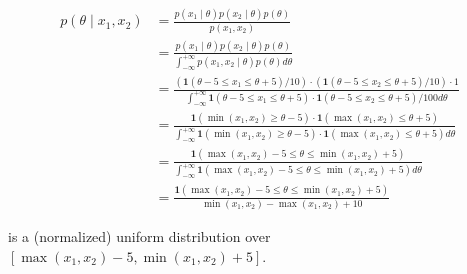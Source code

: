\documentclass[11pt]{article}
\begin{document}
\begin{enumerate}
    $$
    \begin{aligned}
        p(\theta \mid x_{1}, x_{2})
        &= \frac{p(x_{1} \mid \theta) p(x_{2} \mid \theta) p(\theta)}{p(x_{1}, x_{2})} \\
        &= \frac{p(x_{1} \mid \theta) p(x_{2} \mid \theta) p(\theta)}{\int_{-\infty}^{+\infty} p(x_{1}, x_{2} \mid \theta) p(\theta) d \theta} \\
        &= \frac{(\mathbf{1}(\theta - 5 \leq x_{1} \leq \theta + 5) / 10) \cdot (\mathbf{1}(\theta - 5 \leq x_{2} \leq \theta + 5) / 10) \cdot  1}{\int_{-\infty}^{+\infty} \mathbf{1}(\theta - 5 \leq x_{1} \leq \theta + 5) \cdot \mathbf{1}(\theta - 5 \leq x_{2} \leq \theta + 5) / 100 d \theta} \\
        &= \frac{\mathbf{1}(\min(x_{1}, x_2) \geq \theta - 5) \cdot \mathbf{1}(\max(x_{1}, x_2) \leq \theta + 5)}{\int_{-\infty}^{+\infty} \mathbf{1}(\min(x_{1}, x_2) \geq \theta - 5) \cdot \mathbf{1}(\max(x_{1}, x_2) \leq \theta + 5) d \theta} \\
        &= \frac{\mathbf{1}(\max(x_{1}, x_2) - 5 \leq \theta \leq \min(x_{1}, x_2) + 5)}{\int_{-\infty}^{+\infty} \mathbf{1}(\max(x_{1}, x_2) - 5 \leq \theta \leq \min(x_{1}, x_2) + 5) d \theta} \\
        &= \frac{\mathbf{1}(\max(x_{1}, x_2) - 5 \leq \theta \leq \min(x_{1}, x_2) + 5)}{\min(x_{1}, x_2) - \max(x_{1}, x_2) + 10}
    \end{aligned}
    $$

    is a (normalized) uniform distribution over $[\max(x_{1}, x_2) - 5, \min(x_{1}, x_2) + 5]$.

\end{enumerate}
\end{document}
